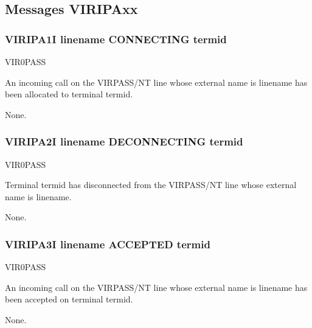 \documentclass[letterpaper,10pt,english]{sphinxmanual}
\begin{document}
\subsection{Messages VIRIPAxx}
\label{\detokenize{messages:messages-viripaxx}}

\subsubsection{VIRIPA1I linename CONNECTING termid}
\label{\detokenize{messages:viripa1i-linename-connecting-termid}}\begin{description}
\sphinxAtStartPar
VIR0PASS

\sphinxAtStartPar
An incoming call on the VIRPASS/NT line whose external name is linename has been allocated to terminal termid.

\sphinxAtStartPar
None.

\end{description}


\subsubsection{VIRIPA2I linename DECONNECTING termid}
\label{\detokenize{messages:viripa2i-linename-deconnecting-termid}}\begin{description}
\sphinxAtStartPar
VIR0PASS

\sphinxAtStartPar
Terminal termid has disconnected from the VIRPASS/NT line whose external name is linename.

\sphinxAtStartPar
None.

\end{description}


\subsubsection{VIRIPA3I linename ACCEPTED termid}
\label{\detokenize{messages:viripa3i-linename-accepted-termid}}\begin{description}
\sphinxAtStartPar
VIR0PASS

\sphinxAtStartPar
An incoming call on the VIRPASS/NT line whose external name is linename has been accepted on terminal termid.

\sphinxAtStartPar
None.

\end{description}
\end{document}

